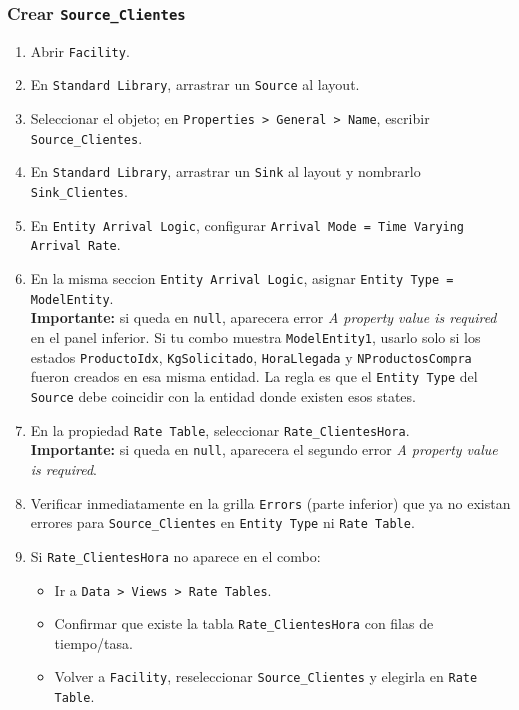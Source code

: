 \documentclass[11pt]{article}
\newcommand{\simio}[1]{\texttt{#1}}
\newcommand{\tabla}[1]{\texttt{#1}}
\newcommand{\state}[1]{\texttt{#1}}
\begin{document}
\subsubsection{Crear \simio{Source\_Clientes}}
\begin{enumerate}
  \item Abrir \simio{Facility}.
  \item En \simio{Standard Library}, arrastrar un \simio{Source} al layout.
  \item Seleccionar el objeto; en \simio{Properties > General > Name}, escribir \simio{Source\_Clientes}.
  \item En \simio{Standard Library}, arrastrar un \simio{Sink} al layout y nombrarlo \simio{Sink\_Clientes}.
  \item En \simio{Entity Arrival Logic}, configurar \simio{Arrival Mode = Time Varying Arrival Rate}.
  \item En la misma seccion \simio{Entity Arrival Logic}, asignar \simio{Entity Type = ModelEntity}.\\
  \textbf{Importante:} si queda en \simio{null}, aparecera error \textit{A property value is required} en el panel inferior. Si tu combo muestra \simio{ModelEntity1}, usarlo solo si los estados \state{ProductoIdx}, \state{KgSolicitado}, \state{HoraLlegada} y \state{NProductosCompra} fueron creados en esa misma entidad. La regla es que el \simio{Entity Type} del \simio{Source} debe coincidir con la entidad donde existen esos states.
  \item En la propiedad \simio{Rate Table}, seleccionar \tabla{Rate\_ClientesHora}.\\
  \textbf{Importante:} si queda en \simio{null}, aparecera el segundo error \textit{A property value is required}.
  \item Verificar inmediatamente en la grilla \simio{Errors} (parte inferior) que ya no existan errores para \simio{Source\_Clientes} en \simio{Entity Type} ni \simio{Rate Table}.
  \item Si \tabla{Rate\_ClientesHora} no aparece en el combo:
  \begin{itemize}
    \item Ir a \simio{Data > Views > Rate Tables}.
    \item Confirmar que existe la tabla \tabla{Rate\_ClientesHora} con filas de tiempo/tasa.
    \item Volver a \simio{Facility}, reseleccionar \simio{Source\_Clientes} y elegirla en \simio{Rate Table}.
  \end{itemize}

\end{enumerate}
\end{document}
